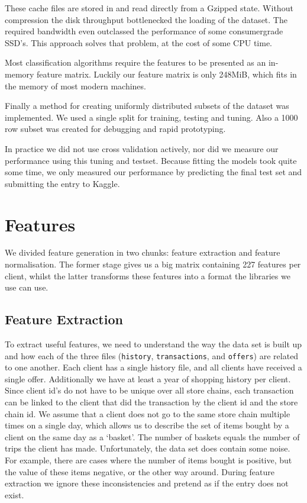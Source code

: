 \documentclass[a4paper]{jmlr}
\begin{document}
These cache files are stored in and read directly from a Gzipped state. Without
compression the disk throughput bottlenecked the loading of the dataset. The
required bandwidth even outclassed the performance of some consumergrade SSD's.
This approach solves that problem, at the cost of some CPU time.

Most classification algorithms require the features to be presented as an
in-memory feature matrix. Luckily our feature matrix is only 248MiB, which fits
in the memory of most modern machines.

Finally a method for creating uniformly distributed subsets of the dataset was
implemented. We used a single split for training, testing and tuning. Also a
1000 row subset was created for debugging and rapid prototyping.

In practice we did not use cross validation actively, nor did we measure our
performance using this tuning and testset. Because fitting the models took quite
some time, we only measured our performance by predicting the final test set and
submitting the entry to Kaggle.

\section{Features}
We divided feature generation in two chunks: feature extraction and feature normalisation. The former stage gives us a big matrix containing 227 features per client, whilst the latter transforms these features into a format the libraries we use can use.

\subsection{Feature Extraction}
To extract useful features, we need to understand the way the data set is built up and how each of the three files (\texttt{history}, \texttt{transactions}, and \texttt{offers}) are related to one another. Each client has a single history file, and all clients have received a single offer. Additionally we have at least a year of shopping history per client. Since client id's do not have to be unique over all store chains, each transaction can be linked to the client that did the transaction by the client id and the store chain id. We assume that a client does not go to the same store chain multiple times on a single day, which allows us to describe the set of items bought by a client on the same day as a `basket'. The number of baskets equals the number of trips the client has made. Unfortunately, the data set does contain some noise. For example, there are cases where the number of items bought is positive, but the value of these items negative, or the other way around. During feature extraction we ignore these inconsistencies and pretend as if the entry does not exist.
\end{document}
